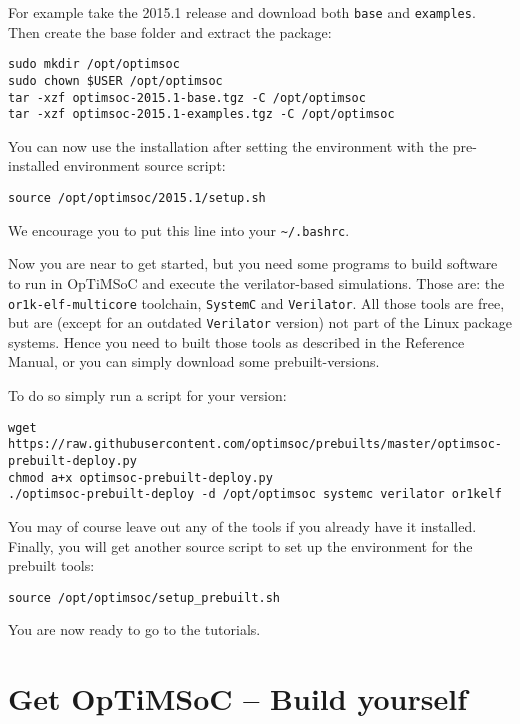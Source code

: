 For example take the 2015.1 release and download both \verb|base| and
\verb|examples|. Then create the base folder and extract the package:

\begin{lstlisting}
sudo mkdir /opt/optimsoc
sudo chown $USER /opt/optimsoc
tar -xzf optimsoc-2015.1-base.tgz -C /opt/optimsoc
tar -xzf optimsoc-2015.1-examples.tgz -C /opt/optimsoc
\end{lstlisting}

You can now use the installation after setting the environment with
the pre-installed environment source script:

\begin{lstlisting}
source /opt/optimsoc/2015.1/setup.sh
\end{lstlisting}

We encourage you to put this line into your \verb|~/.bashrc|.

Now you are near to get started, but you need some programs to build
software to run in OpTiMSoC and execute the verilator-based
simulations. Those are: the \verb|or1k-elf-multicore| toolchain,
\verb|SystemC| and \verb|Verilator|. All those tools are free, but are
(except for an outdated \verb|Verilator| version) not part of the
Linux package systems. Hence you need to built those tools as
described in the Reference Manual, or you can simply download some
prebuilt-versions.

To do so simply run a script for your version:

\begin{lstlisting}
wget https://raw.githubusercontent.com/optimsoc/prebuilts/master/optimsoc-prebuilt-deploy.py
chmod a+x optimsoc-prebuilt-deploy.py
./optimsoc-prebuilt-deploy -d /opt/optimsoc systemc verilator or1kelf
\end{lstlisting}

You may of course leave out any of the tools if you already have it
installed. Finally, you will get another source script to set up the
environment for the prebuilt tools:

\begin{lstlisting}
source /opt/optimsoc/setup_prebuilt.sh
\end{lstlisting}

You are now ready to go to the tutorials.

\section{Get OpTiMSoC -- Build yourself}

